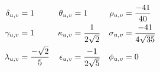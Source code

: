\begin{align}
\deltauv     &= 1 
& \thetauv   &= 1 
& \rhouv     &= \frac{-41}{40}
	\nonumber\\
\gammauv     &= 1 
& \kappauv   &=\frac{1}{2\sqrt{2}} %
& \sigmauv   &= \frac{-41}{4\sqrt{35}}
	\nonumber\\
\lambdauv    &= \frac{-\sqrt{2} }{5} %
& \epsilonuv &= \frac{-1}{2\sqrt{5}}
& \phiuv     &= 0 %
\label{eq:holstein_greekletterfunctions}
\end{align}